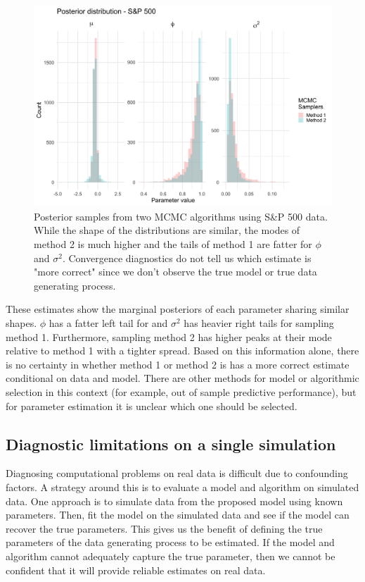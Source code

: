 \documentclass[12pt, a4paper]{article}
\begin{document}
    \begin{figure}[h]
        \centering
        \includegraphics[scale=0.1]{motivating_example/real_data_ex.png}
        \caption{Posterior samples from two MCMC algorithms using S\&P 500 data. While the shape of the distributions are similar, the modes of method 2 is much higher and the tails of method 1 are fatter for $\phi$ and $\sigma^2$. Convergence diagnostics do not tell us which estimate is "more correct" since we don't observe the true model or true data generating process.}
    \end{figure}

    These estimates show the marginal posteriors of each parameter sharing similar shapes. $\phi$  has a fatter left tail for and $\sigma^2$ has heavier right tails for sampling method 1. Furthermore, sampling method 2 has higher peaks at their mode relative to method 1 with a tighter spread. Based on this information alone, there is no certainty in whether method 1 or method 2 is has a more correct estimate conditional on data and model. There are other methods for model or algorithmic selection in this context (for example, out of sample predictive performance), but for parameter estimation it is unclear which one should be selected. 

\subsection{Diagnostic limitations on a single simulation}
    Diagnosing computational problems on real data is difficult due to confounding factors. A strategy around this is to evaluate a model and algorithm on simulated data. One approach is to simulate data from the proposed model using known parameters. Then, fit the model on the simulated data and see if the model can recover the true parameters. This gives us the benefit of defining the true parameters of the data generating process to be estimated. If the model and algorithm cannot adequately capture the true parameter, then we cannot be confident that it will provide reliable estimates on real data.
\end{document}
